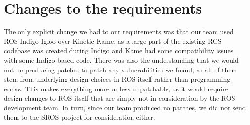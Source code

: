 \documentclass[IEEEtran,letterpaper,10pt,notitlepage,draftclsnofoot,onecolumn]{article}
\begin{document}
\section{Changes to the requirements}
The only explicit change we had to our requirements was that our team used 
ROS Indigo Igloo over Kinetic Kame, as a large part of the existing ROS codebase
was created during Indigo and Kame had some compatibility issues with some 
Indigo-based code. There was also the understanding that we would not be 
producing patches to patch any vulnerabilities we found, as all of them
stem from underlying design choices in ROS itself rather than programming
errors. This makes everything more or less unpatchable, as it would require
design changes to ROS itself that are simply not in consideration by the 
ROS development team. In turn, since our team produced no patches, we did 
not send them to the SROS project for consideration either.
\end{document}
